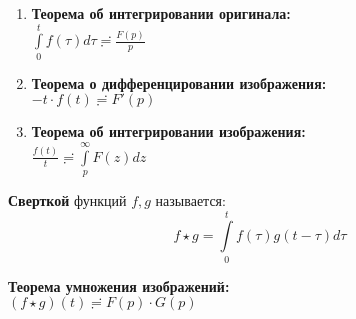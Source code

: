 \begin{enumerate}
\begin{proof}
        $|f(t)e^{-pt}|\leq M\cdot e^{(\alpha-Re\,p)t}\to0$ при $r\to +\infty, \alpha -Re\,p <0$\\
        $f'(t)\risingdotseq -f(0)+p\cdot F(p)$
    \end{proof}
    \item \textbf{Теорема об интегрировании оригинала:}\\
    $\int\limits_0^tf(\tau)d\tau\risingdotseq\frac{F(p)}{p}$
    \item \textbf{Теорема о дифференцировании изображения:}\\
    $-t\cdot f(t)\risingdotseq F'(p)$
    \item \textbf{Теорема об интегрировании изображения:}\\
    $\frac{f(t)}{t}\risingdotseq \int\limits_p^{\infty}F(z)dz$\\[2mm]
\end{enumerate}

\textbf{Сверткой} функций $f, g$ называется:
$$f \star g = \int\limits_0^t f(\tau)g(t-\tau)d\tau$$

\textbf{Теорема умножения изображений:}\\
$(f\star g)(t)\risingdotseq F(p)\cdot G(p)$

